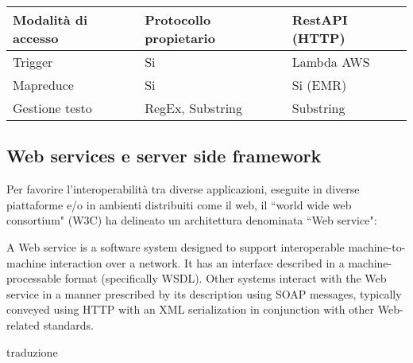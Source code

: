 \begin{table}[htb]
\begin{tabular}{|l|l|l|}
Modalità di accesso & Protocollo propietario                                                                                                    & RestAPI (HTTP)                                                                                                              \\ \hline
Trigger             & Si                                                                                                                        & Lambda AWS                                                                                                                  \\ \hline
Mapreduce           & Si                                                                                                                        & Si (EMR)                                                                                                                    \\ \hline
Gestione testo      & RegEx, Substring                                                                                                          & Substring                                                                                                                   \\ \hline
\end{tabular}


\end{table}

\subsection{Web services e server side framework}
Per favorire l'interoperabilità tra diverse applicazioni, eseguite in diverse piattaforme e/o in ambienti distribuiti come il web, il ``world wide web consortium" (W3C) ha delineato un architettura denominata ``Web service": 

A Web service is a software system designed to support interoperable machine-to-machine interaction over a network. It has an interface described in a machine-processable format (specifically WSDL). Other systems interact with the Web service in a manner prescribed by its description using SOAP messages, typically conveyed using HTTP with an XML serialization in conjunction with other Web-related standards. 


traduzione


